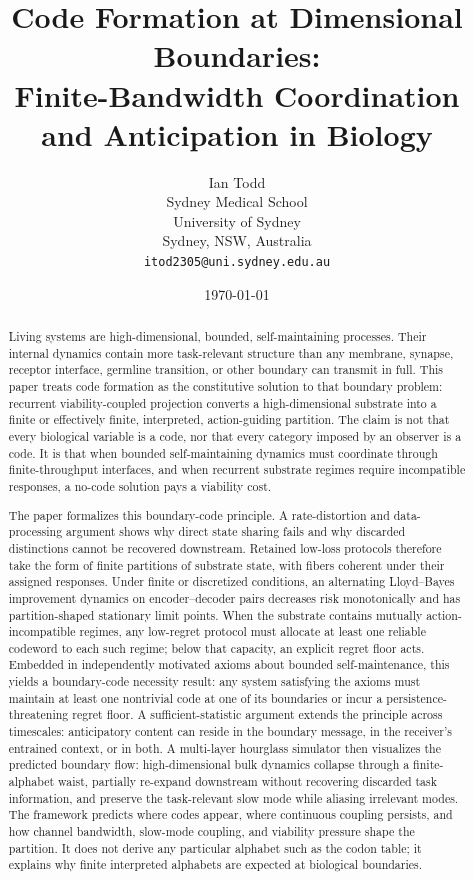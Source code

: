 \documentclass[12pt]{article}
\title{Code Formation at Dimensional Boundaries:\\
Finite-Bandwidth Coordination and Anticipation in Biology}
\author{Ian Todd\\
Sydney Medical School\\
University of Sydney\\
Sydney, NSW, Australia\\
\texttt{itod2305@uni.sydney.edu.au}}
\date{\today}
\theoremstyle{definition}
\begin{document}
\maketitle

\begin{abstract}
Living systems are high-dimensional, bounded, self-maintaining processes. Their internal dynamics contain more task-relevant structure than any membrane, synapse, receptor interface, germline transition, or other boundary can transmit in full. This paper treats code formation as the constitutive solution to that boundary problem: recurrent viability-coupled projection converts a high-dimensional substrate into a finite or effectively finite, interpreted, action-guiding partition. The claim is not that every biological variable is a code, nor that every category imposed by an observer is a code. It is that when bounded self-maintaining dynamics must coordinate through finite-throughput interfaces, and when recurrent substrate regimes require incompatible responses, a no-code solution pays a viability cost.

The paper formalizes this boundary-code principle. A rate-distortion and data-processing argument shows why direct state sharing fails and why discarded distinctions cannot be recovered downstream. Retained low-loss protocols therefore take the form of finite partitions of substrate state, with fibers coherent under their assigned responses. Under finite or discretized conditions, an alternating Lloyd--Bayes improvement dynamics on encoder--decoder pairs decreases risk monotonically and has partition-shaped stationary limit points. When the substrate contains mutually action-incompatible regimes, any low-regret protocol must allocate at least one reliable codeword to each such regime; below that capacity, an explicit regret floor acts. Embedded in independently motivated axioms about bounded self-maintenance, this yields a boundary-code necessity result: any system satisfying the axioms must maintain at least one nontrivial code at one of its boundaries or incur a persistence-threatening regret floor. A sufficient-statistic argument extends the principle across timescales: anticipatory content can reside in the boundary message, in the receiver's entrained context, or in both. A multi-layer hourglass simulator then visualizes the predicted boundary flow: high-dimensional bulk dynamics collapse through a finite-alphabet waist, partially re-expand downstream without recovering discarded task information, and preserve the task-relevant slow mode while aliasing irrelevant modes. The framework predicts where codes appear, where continuous coupling persists, and how channel bandwidth, slow-mode coupling, and viability pressure shape the partition. It does not derive any particular alphabet such as the codon table; it explains why finite interpreted alphabets are expected at biological boundaries.
\end{abstract}
\end{document}
